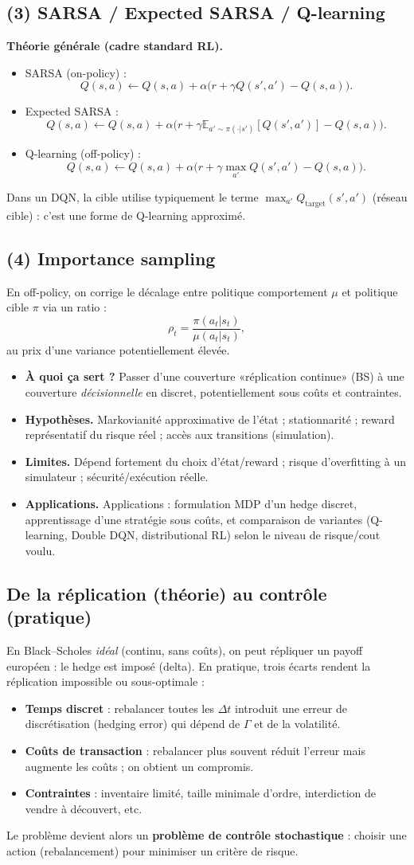 \documentclass[11pt,a4paper]{report}
\theoremstyle{definition}
\theoremstyle{plain}
\theoremstyle{remark}
\newcommand{\E}{\mathbb{E}}
\newcommand{\1}{\mathbf{1}}
\newcommand{\qa}[4]{
\begin{itemize}[leftmargin=*]
\item \textbf{À quoi ça sert ?} #1
\item \textbf{Hypothèses.} #2
\item \textbf{Limites.} #3
\item \textbf{Applications.} #4
\end{itemize}
}
\begin{document}
\subsection*{(3) SARSA / Expected SARSA / Q-learning}
\textbf{Théorie générale (cadre standard RL).}
\begin{itemize}[leftmargin=*]
\item SARSA (on-policy) :
\[
Q(s,a)\leftarrow Q(s,a)+\alpha\big(r+\gamma Q(s',a')-Q(s,a)\big).
\]
\item Expected SARSA :
\[
Q(s,a)\leftarrow Q(s,a)+\alpha\big(r+\gamma \E_{a'\sim\pi(\cdot|s')}[Q(s',a')]-Q(s,a)\big).
\]
\item Q-learning (off-policy) :
\[
Q(s,a)\leftarrow Q(s,a)+\alpha\big(r+\gamma \max_{a'}Q(s',a')-Q(s,a)\big).
\]
\end{itemize}
Dans un DQN, la cible utilise typiquement le terme $\max_{a'} Q_{\text{target}}(s',a')$ (réseau cible) : c'est une forme de Q-learning approximé.

\subsection*{(4) Importance sampling}
En off-policy, on corrige le décalage entre politique comportement $\mu$ et politique cible $\pi$ via un ratio :
\[
\rho_t=\frac{\pi(a_t|s_t)}{\mu(a_t|s_t)},
\]
au prix d'une variance potentiellement élevée.

\qa
{Passer d'une couverture «réplication continue» (BS) à une couverture \emph{décisionnelle} en discret, potentiellement sous coûts et contraintes.}
{Markovianité approximative de l'état ; stationnarité ; reward représentatif du risque réel ; accès aux transitions (simulation).}
{Dépend fortement du choix d'état/reward ; risque d'overfitting à un simulateur ; sécurité/exécution réelle.}
{Applications : formulation MDP d'un hedge discret, apprentissage d'une stratégie sous coûts, et comparaison de variantes (Q-learning, Double DQN, distributional RL) selon le niveau de risque/cout voulu.}

\subsection*{De la réplication (théorie) au contrôle (pratique)}
En Black--Scholes \emph{idéal} (continu, sans coûts), on peut répliquer un payoff européen : le hedge est imposé (delta).
En pratique, trois écarts rendent la réplication impossible ou sous-optimale :
\begin{itemize}[leftmargin=*]
\item \textbf{Temps discret} : rebalancer toutes les $\Delta t$ introduit une erreur de discrétisation (hedging error) qui dépend de $\Gamma$ et de la volatilité.
\item \textbf{Coûts de transaction} : rebalancer plus souvent réduit l'erreur mais augmente les coûts ; on obtient un compromis.
\item \textbf{Contraintes} : inventaire limité, taille minimale d'ordre, interdiction de vendre à découvert, etc.
\end{itemize}
Le problème devient alors un \textbf{problème de contrôle stochastique} : choisir une action (rebalancement) pour minimiser un critère de risque.
\end{document}
